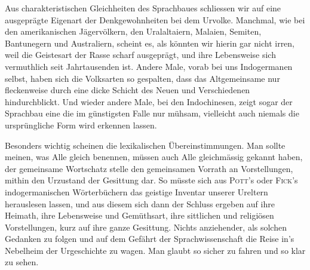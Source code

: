 {Aus charakteristischen Gleichheiten des Sprachbaues schliessen wir auf eine ausgeprägte Eigenart der Denkgewohnheiten bei dem Urvolke. Manchmal, wie bei den amerikanischen Jägervölkern, den Uralaltaiern, Malaien, Semiten, Bantunegern und Australiern, scheint es, als könnten wir hierin gar nicht irren, weil die Geistesart der Rasse scharf ausgeprägt, und ihre Lebensweise sich vermuthlich seit Jahrtausenden  ist. Andere Male, vorab bei uns Indogermanen selbst, haben sich die Volksarten so gespalten, dass das Altgemeinsame nur fleckenweise durch eine dicke Schicht des Neuen und Verschiedenen hindurchblickt. Und wieder andere Male, bei den Indochinesen, zeigt sogar der Sprachbau eine  die im günstigsten Falle nur mühsam, vielleicht auch niemals die ursprüngliche Form wird erkennen lassen.

\largerpage[-1]

Besonders wichtig scheinen die lexikalischen Übereinstimmungen. \label{fp.288} Man sollte meinen, was Alle gleich benennen, müssen auch Alle gleichmässig gekannt haben, der gemeinsame Wortschatz stelle den gemeinsamen Vorrath an Vorstellungen, mithin den Urzustand der Gesittung dar. So müsste sich aus \textsc{Pott}’s oder \textsc{Fick}’s indogermanischen Wörterbüchern das geistige Inventar unserer Ureltern herauslesen lassen, und aus diesem sich dann der Schluss ergeben auf ihre Heimath, ihre Lebensweise und Gemüthsart, ihre sittlichen und religiösen \label{sp.294} Vorstellungen, kurz auf ihre ganze Gesittung. Nichts anziehender, als solchen  Gedanken zu folgen und auf dem Gefährt der Sprachwissenschaft die Reise in’s Nebelheim der Urgeschichte zu wagen. Man glaubt so sicher zu fahren und so klar zu sehen.

}
